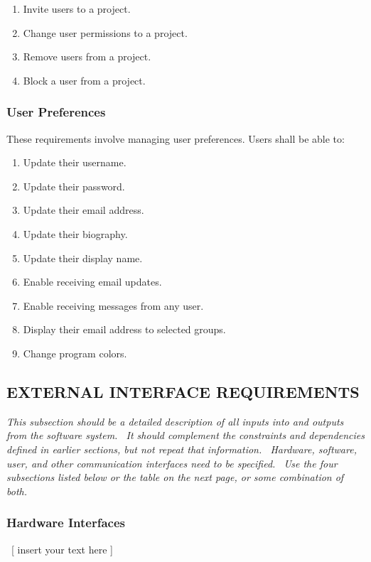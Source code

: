 \documentclass[twoside,letterpaper]{article}
\begin{document}
{\begin{enumerate}
	\item Invite users to a project.
	\item Change user permissions to a project.
	\item Remove users from a project.
	\item Block a user from a project.
\end{enumerate}

\subsubsection{User Preferences}

These requirements involve managing user preferences. Users shall be able to:

\begin{enumerate}
	\item Update their username.
	\item Update their password.
	\item Update their email address.
	\item Update their biography.
	\item Update their display name.
	\item Enable receiving email updates.
	\item Enable receiving messages from any user.
	\item Display their email address to selected groups.
	\item Change program colors.
\end{enumerate}

}

\subsection[EXTERNAL INTERFACE REQUIREMENTS]{\rmfamily\bfseries\color{black} EXTERNAL INTERFACE
REQUIREMENTS}
\hypertarget{RefHeading20659017292}{}{\itshape\color{black}
This subsection should be a detailed description of all inputs into and outputs from the software system. \ It should
complement the constraints and dependencies defined in earlier sections, but not repeat that information. \ Hardware,
software, user, and other communication interfaces need to be specified. \ Use the four subsections listed below or the
table on the next page, or some combination of both.}

\subsubsection[Hardware Interfaces]{\rmfamily\bfseries\color{black} Hardware Interfaces}
\hypertarget{RefHeading20859017292}{}{\color{black}
\foreignlanguage{english}{\ [ insert your text here ]}}
\end{document}
